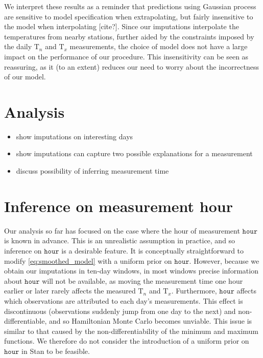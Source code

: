 \documentclass[letter]{article}
\providecommand{\tightlist}{%
      \setlength{\itemsep}{0pt}\setlength{\parskip}{0pt}}
\newcommand{\T}{\mathrm{T}}
\newcommand{\Tn}{\T_{n}}
\newcommand{\Tx}{\T_{x}}
\newcommand{\hour}{\mathtt{hour}}
\providecommand{\tightlist}{%
  	  \setlength{\itemsep}{0pt}\setlength{\parskip}{0pt}}
\begin{document}
We interpret these results as a reminder that predictions using Gaussian process are sensitive to model specification when extrapolating, but fairly insensitive to the model when interpolating {[}cite?{]}. Since our imputations interpolate the temperatures from nearby stations, further aided by the constraints imposed by the daily \(\Tn\) and \(\Tx\) measurements, the choice of model does not have a large impact on the performance of our procedure. This insensitivity can be seen as reassuring, as it (to an extent) reduces our need to worry about the incorrectness of our model.
    


        \section{Analysis}\label{analysis}

\begin{itemize}
\tightlist
\item
  show imputations on interesting days
\item
  show imputations can capture two possible explanations for a measurement
\item
  discuss possibility of inferring measurement time
\end{itemize}
    


        \section{Inference on measurement hour}\label{inference-on-measurement-hour}

Our analysis so far has focused on the case where the hour of measurement \(\hour\) is known in advance.
This is an unrealistic assumption in practice, and so inference on \(\hour\) is a desirable feature.
It is conceptually straightforward to modify \eqref{eq:smoothed_model} with a uniform prior on \(\hour\).
However, because we obtain our imputations in ten-day windows, in most windows precise information about \(\hour\) will not be available, as moving the measurement time one hour earlier or later rarely affects the measured \(\Tn\) and \(\Tx\).
Furthermore, \(\hour\) affects which observations are attributed to each day's measurements.
This effect is discontinuous (observations suddenly jump from one day to the next) and non-differentiable, and so Hamiltonian Monte Carlo becomes unviable.
This issue is similar to that caused by the non-differentiability of the minimum and maximum functions.
We therefore do not consider the introduction of a uniform prior on \(\hour\) in Stan to be feasible.
\end{document}

